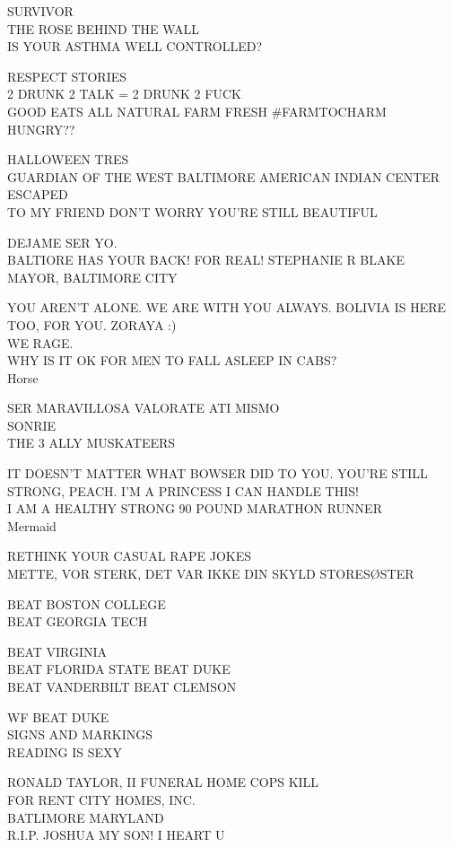 \documentclass[10pt,letterpaper]{article}
\begin{document}
SURVIVOR\\
THE ROSE BEHIND THE WALL\\
IS YOUR ASTHMA WELL CONTROLLED?

RESPECT STORIES\\
2 DRUNK 2 TALK = 2 DRUNK 2 FUCK\\
GOOD EATS ALL NATURAL FARM FRESH \#FARMTOCHARM\\
HUNGRY??

HALLOWEEN TRES\\
GUARDIAN OF THE WEST BALTIMORE AMERICAN INDIAN CENTER\\
ESCAPED\\
TO MY FRIEND DON'T WORRY YOU'RE STILL BEAUTIFUL

DEJAME SER YO.\\
BALTIORE HAS YOUR BACK!  FOR REAL!  STEPHANIE R BLAKE MAYOR, BALTIMORE CITY

YOU AREN'T ALONE.  WE ARE WITH YOU ALWAYS.  BOLIVIA IS HERE TOO, FOR YOU.  ZORAYA :)\\
WE RAGE.\\
WHY IS IT OK FOR MEN TO FALL ASLEEP IN CABS?\\
Horse

SER MARAVILLOSA VALORATE ATI MISMO\\
SONRIE\\
THE 3 ALLY MUSKATEERS

IT DOESN'T MATTER WHAT BOWSER DID TO YOU.  YOU'RE STILL STRONG, PEACH.  I'M A PRINCESS I CAN HANDLE THIS!\\
I AM A HEALTHY STRONG 90 POUND MARATHON RUNNER\\
Mermaid

RETHINK YOUR CASUAL RAPE JOKES\\
METTE, VOR STERK, DET VAR IKKE DIN SKYLD STORESØSTER

BEAT BOSTON COLLEGE\\
BEAT GEORGIA TECH

BEAT VIRGINIA\\
BEAT FLORIDA STATE BEAT DUKE\\
BEAT VANDERBILT BEAT CLEMSON

WF BEAT DUKE\\
SIGNS AND MARKINGS\\
READING IS SEXY

RONALD TAYLOR, II FUNERAL HOME COPS KILL\\
FOR RENT CITY HOMES, INC.\\
BATLIMORE MARYLAND\\
R.I.P. JOSHUA MY SON! I HEART U
\end{document}
